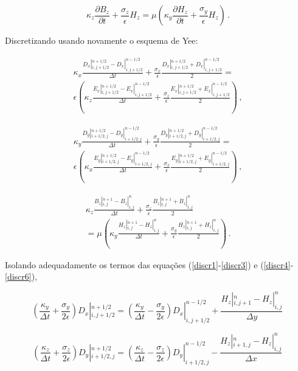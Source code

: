 \documentclass[a4paper,10pt]{article}
\begin{document}
\begin{equation}
\kappa_z \dfrac{\partial B_z}{\partial t} + \frac{\sigma_z}{\epsilon}H_z=
\mu \left( \kappa_y \dfrac{\partial H_z}{\partial t} + \frac{\sigma_y}{\epsilon}H_z\right)\,.
\end{equation}

Discretizando usando novamente o esquema de Yee:

\begin{align}
\kappa_x \frac{ D_x |_{i,j+1/2}^{n+1/2}-D_x |_{i,j+1/2}^{n-1/2}}{\Delta t}
+ \frac{\sigma_x}{\epsilon}\frac{D_x |_{i,j+1/2}^{n+1/2}+D_x |_{i,j+1/2}^{n-1/2}}{2}= \nonumber
\\ \epsilon \left( \kappa_z \frac{ E_x |_{i,j+1/2}^{n+1/2}-E_x |_{i,j+1/2}^{n-1/2}}{\Delta t}
+ \frac{\sigma_z}{\epsilon}\frac{E_x |_{i,j+1/2}^{n+1/2}+E_x |_{i,j+1/2}^{n-1/2}}{2}\right)\,, \label{discr4}
\end{align}

\begin{align}
\kappa_y \frac{ D_y |_{i+1/2,j}^{n+1/2}-D_y |_{i+1/2,j}^{n-1/2}}{\Delta t}
+ \frac{\sigma_y}{\epsilon}\frac{D_y |_{i+1/2,j}^{n+1/2}+D_y |_{i+1/2,j}^{n-1/2}}{2}= \nonumber
\\ \epsilon \left( \kappa_x \frac{ E_y |_{i+1/2,j}^{n+1/2}-E_y |_{i+1/2,j}^{n-1/2}}{\Delta t}
+ \frac{\sigma_x}{\epsilon}\frac{E_y |_{i+1/2,j}^{n+1/2}+E_y |_{i+1/2,j}^{n-1/2}}{2}\right)\,, \label{discr5}
\end{align}

\begin{align}
\kappa_z \frac{ B_z |_{i,j}^{n+1}-B_z |_{i,j}^{n}}{\Delta t}
+ \frac{\sigma_z}{\epsilon}\frac{B_z |_{i,j}^{n+1}+B_z |_{i,j}^{n}}{2}\nonumber
\\ =\mu \left( \kappa_y \frac{ H_z |_{i,j}^{n+1}-H_z |_{i,j}^{n}}{\Delta t}
+ \frac{\sigma_y}{\epsilon}\frac{H_z |_{i,j}^{n+1}+H_z |_{i,j}^{n}}{2}\right)\,. \label{discr6}
\end{align}

Isolando adequadamente os termos das equações (\ref{discr1}-\ref{discr3}) e (\ref{discr4}-\ref{discr6}),

\begin{equation}
 \left( \frac{\kappa_y}{\Delta t} + \frac{\sigma_y}{2 \epsilon} \right) D_x |_{i,j+1/2}^{n+1/2} = 
\left( \frac{\kappa_y}{\Delta t} - \frac{\sigma_y}{2 \epsilon} \right) D_x |_{i,j+1/2}^{n-1/2}+
\frac{H_z |_{i,j+1}^{n}-H_z |_{i,j}^{n}}{\Delta y}\,
\end{equation}

\begin{equation}
 \left( \frac{\kappa_z}{\Delta t} + \frac{\sigma_z}{2 \epsilon} \right) D_y |_{i+1/2,j}^{n+1/2} = 
\left( \frac{\kappa_z}{\Delta t} - \frac{\sigma_z}{2 \epsilon} \right) D_y |_{i+1/2,j}^{n-1/2} -
\frac{H_z |_{i+1,j}^{n}-H_z |_{i,j}^{n}}{\Delta x}\,
\end{equation}
\end{document}
